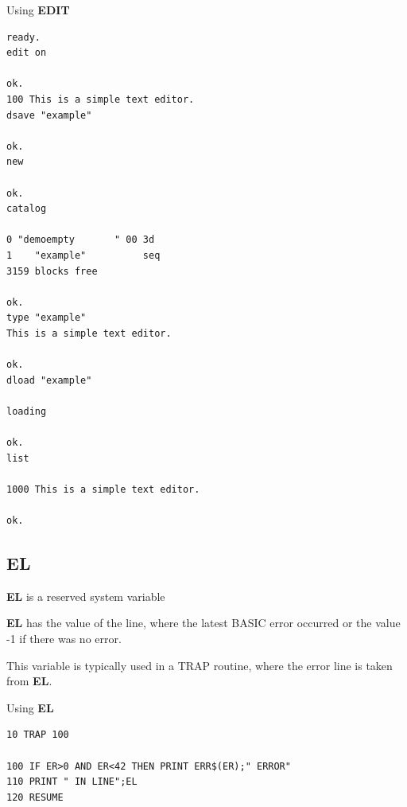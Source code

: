 \begin{description}[leftmargin=2cm,style=nextline]
\item [Example:] Using {\bf EDIT}
\begin{tcolorbox}[colback=black,coltext=white]
\verbatimfont{\codefont}
\begin{verbatim}
ready.
edit on

ok.
100 This is a simple text editor.
dsave "example"

ok.
new

ok.
catalog

0 "demoempty       " 00 3d
1    "example"          seq
3159 blocks free

ok.
type "example"
This is a simple text editor.

ok.
dload "example"

loading

ok.
list

1000 This is a simple text editor.

ok.
\end{verbatim}
\end{tcolorbox}
\end{description}


\newpage
\subsection{EL}
\begin{description}[leftmargin=2cm,style=nextline]
\item [Format:] {\bf EL} is a reserved system variable
\item [Usage:]  {\bf EL} has the value of the line, where
               the latest BASIC error
               occurred or the value -1 if there was no error.

This variable is typically used in a TRAP routine,
where the error line is taken from {\bf EL}.

\item [Example:] Using {\bf EL}
\begin{tcolorbox}[colback=black,coltext=white]
\verbatimfont{\codefont}
\begin{verbatim}
10 TRAP 100

100 IF ER>0 AND ER<42 THEN PRINT ERR$(ER);" ERROR"
110 PRINT " IN LINE";EL
120 RESUME
\end{verbatim}
\end{tcolorbox}
\end{description}


